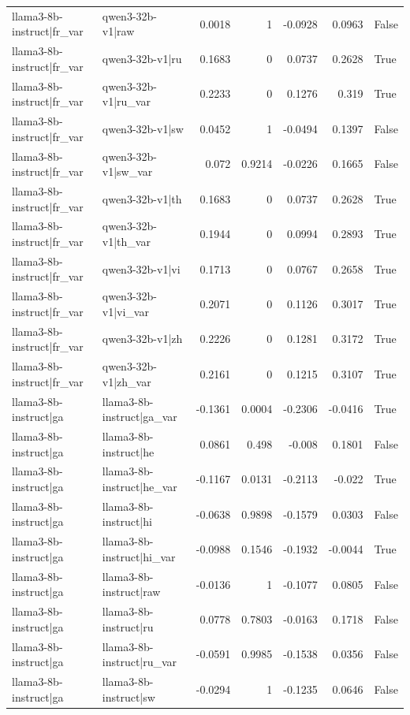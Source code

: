 \begin{table}
\begin{tabular}{l l r r r r l}
llama3-8b-instruct|fr_var & qwen3-32b-v1|raw & 0.0018 & 1 & -0.0928 & 0.0963 & False \\
llama3-8b-instruct|fr_var & qwen3-32b-v1|ru & 0.1683 & 0 & 0.0737 & 0.2628 & True \\
llama3-8b-instruct|fr_var & qwen3-32b-v1|ru_var & 0.2233 & 0 & 0.1276 & 0.319 & True \\
llama3-8b-instruct|fr_var & qwen3-32b-v1|sw & 0.0452 & 1 & -0.0494 & 0.1397 & False \\
llama3-8b-instruct|fr_var & qwen3-32b-v1|sw_var & 0.072 & 0.9214 & -0.0226 & 0.1665 & False \\
llama3-8b-instruct|fr_var & qwen3-32b-v1|th & 0.1683 & 0 & 0.0737 & 0.2628 & True \\
llama3-8b-instruct|fr_var & qwen3-32b-v1|th_var & 0.1944 & 0 & 0.0994 & 0.2893 & True \\
llama3-8b-instruct|fr_var & qwen3-32b-v1|vi & 0.1713 & 0 & 0.0767 & 0.2658 & True \\
llama3-8b-instruct|fr_var & qwen3-32b-v1|vi_var & 0.2071 & 0 & 0.1126 & 0.3017 & True \\
llama3-8b-instruct|fr_var & qwen3-32b-v1|zh & 0.2226 & 0 & 0.1281 & 0.3172 & True \\
llama3-8b-instruct|fr_var & qwen3-32b-v1|zh_var & 0.2161 & 0 & 0.1215 & 0.3107 & True \\
llama3-8b-instruct|ga & llama3-8b-instruct|ga_var & -0.1361 & 0.0004 & -0.2306 & -0.0416 & True \\
llama3-8b-instruct|ga & llama3-8b-instruct|he & 0.0861 & 0.498 & -0.008 & 0.1801 & False \\
llama3-8b-instruct|ga & llama3-8b-instruct|he_var & -0.1167 & 0.0131 & -0.2113 & -0.022 & True \\
llama3-8b-instruct|ga & llama3-8b-instruct|hi & -0.0638 & 0.9898 & -0.1579 & 0.0303 & False \\
llama3-8b-instruct|ga & llama3-8b-instruct|hi_var & -0.0988 & 0.1546 & -0.1932 & -0.0044 & True \\
llama3-8b-instruct|ga & llama3-8b-instruct|raw & -0.0136 & 1 & -0.1077 & 0.0805 & False \\
llama3-8b-instruct|ga & llama3-8b-instruct|ru & 0.0778 & 0.7803 & -0.0163 & 0.1718 & False \\
llama3-8b-instruct|ga & llama3-8b-instruct|ru_var & -0.0591 & 0.9985 & -0.1538 & 0.0356 & False \\
llama3-8b-instruct|ga & llama3-8b-instruct|sw & -0.0294 & 1 & -0.1235 & 0.0646 & False \\

\end{tabular}
\end{table}
